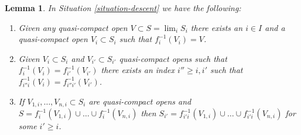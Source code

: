 \documentclass{amsart}
\theoremstyle{plain}
\newtheorem{lemma}[subsection]{Lemma}
\theoremstyle{definition}
\theoremstyle{remark}
\numberwithin{equation}{subsection}
\def\lim{\mathop{\mathrm{lim}}\nolimits}
\begin{document}
\begin{lemma}
\label{lemma-descend-opens}
In Situation \ref{situation-descent} we have the following:
\begin{enumerate}
\item Given any quasi-compact open $V \subset S = \lim_i S_i$
there exists an $i \in I$ and a quasi-compact open $V_i \subset S_i$
such that $f_i^{-1}(V_i) = V$.
\item Given $V_i \subset S_i$ and $V_{i'} \subset S_{i'}$
quasi-compact opens such that $f_i^{-1}(V_i) = f_{i'}^{-1}(V_{i'})$
there exists an index $i'' \geq i, i'$ such that
$f_{i''i}^{-1}(V_i) = f_{i''i'}^{-1}(V_{i'})$.
\item If $V_{1, i}, \ldots, V_{n, i} \subset S_i$ are quasi-compact
opens and $S = f_i^{-1}(V_{1, i}) \cup \ldots \cup f_i^{-1}(V_{n, i})$
then $S_{i'} = f_{i'i}^{-1}(V_{1, i}) \cup \ldots \cup f_{i'i}^{-1}(V_{n, i})$
for some $i' \geq i$.
\end{enumerate}
\end{lemma}
\end{document}
